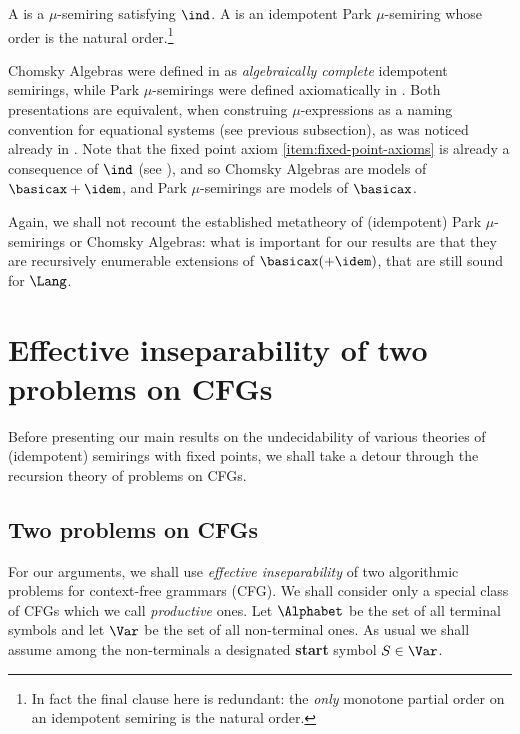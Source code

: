 \documentclass[runningheads]{amsart}
\begin{document}
\begin{definition}
        A  is a $\mu$-semiring satisfying $\ind$. A  is an idempotent Park $\mu$-semiring whose order is the natural order.\footnote{In fact the final clause here is redundant: the \emph{only} monotone partial order on an idempotent semiring is the natural order.}
\end{definition}

Chomsky Algebras were defined in \cite{GHK13,Leiss16} as \emph{algebraically complete} idempotent semirings, while Park $\mu$-semirings were defined axiomatically in \cite{EsikLeiss02,EsikLeiss05}. 
Both presentations are equivalent, when construing $\mu$-expressions as a naming convention for equational systems (see previous subsection), as was noticed already in \cite{GHK13}.
Note that the fixed point axiom \eqref{item:fixed-point-axioms} is already a consequence of $\ind$ (see \cite{EsikLeiss02,EsikLeiss05}), and so Chomsky Algebras are models of $\basicax+\idem$, and Park $\mu$-semirings are models of $\basicax$.



Again, we shall not recount the established metatheory of (idempotent) Park $\mu$-semirings or Chomsky Algebras: what is important for our results are that they are recursively enumerable extensions of $\basicax (+ \idem)$, that are still sound for $\Lang$.

% 

\section{Effective inseparability of two problems on CFGs}
\label{sec:eff-insep}

Before presenting our main results on the undecidability of various theories of (idempotent) semirings with fixed points, we shall take a detour through the recursion theory of problems on CFGs.

\subsection{Two problems on CFGs}

For our arguments, we shall use {\em effective inseparability} of two algorithmic problems for context-free grammars (CFG). 
We shall consider only a special class of CFGs which we call \emph{productive} ones. Let $\Alphabet$ be the set of all terminal symbols and let $\Var$ be the set of all non-terminal ones.
As usual we shall assume among the non-terminals a designated \textbf{start} symbol $S \in \Var$.
\end{document}
